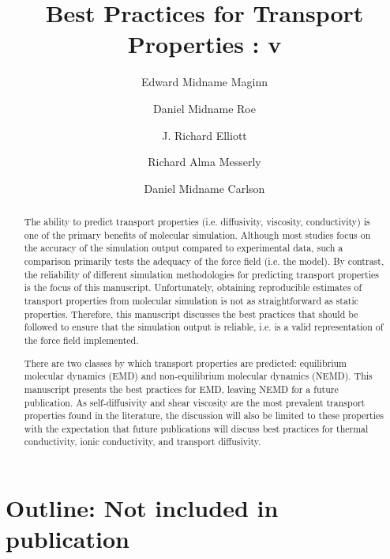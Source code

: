 \documentclass[9pt]{livecoms}
\title{Best Practices for Transport Properties : v\versionnumber}
\author[1*,\authfn{1}\authfn{3}]{Edward Midname Maginn}
\author[2\authfn{1}\authfn{4}]{Daniel Midname Roe}
\author[3\authfn{1}\authfn{5}]{J. Richard Elliott}
\author[4\authfn{1}\authfn{6}]{Richard Alma Messerly}
\author[5\authfn{1}\authfn{7}]{Daniel Midname Carlson}
\affil[1]{The University of Notre Dame}
\affil[2]{Roe's institution}
\affil[3]{The University of Akron}
\affil[4]{National Institute of Standards and Technology}
\affil[5]{Brigham Young University}
\begin{document}
\maketitle

\begin{abstract}

The ability to predict transport properties (i.e. diffusivity, viscosity, conductivity) is one of the primary benefits of molecular simulation. Although most studies focus on the accuracy of the simulation output compared to experimental data, such a comparison primarily tests the adequacy of the force field (i.e. the model). By contrast, the reliability of different simulation methodologies for predicting transport properties is the focus of this manuscript. Unfortunately, obtaining reproducible estimates of transport properties from molecular simulation is not as straightforward as static properties. Therefore, this manuscript discusses the best practices that should be followed to ensure that the simulation output is reliable, i.e. is a valid representation of the force field implemented.

There are two classes by which transport properties are predicted: equilibrium molecular dynamics (EMD) and non-equilibrium molecular dynamics (NEMD). This manuscript presents the best practices for EMD, leaving NEMD for a future publication. As self-diffusivity and shear viscosity are the most prevalent transport properties found in the literature, the discussion will also be limited to these properties with the expectation that future publications will discuss best practices for thermal conductivity, ionic conductivity, and transport diffusivity.

\end{abstract}



\section{Outline: Not included in publication}
\end{document}
